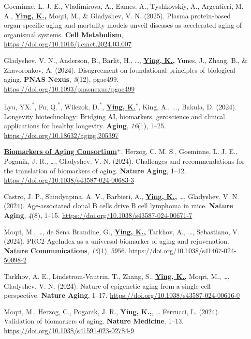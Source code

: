 \documentclass[
  11pt,
]
{article}
\begin{document}
Goeminne, L. J. E., Vladimirova, A., Eames, A., Tyshkovskiy, A.,
Argentieri, M. A., \textbf{\underline{Ying, K.,}} Moqri, M., \&
Gladyshev, V. N. (2025). Plasma protein-based organ-specific aging and
mortality models unveil diseases as accelerated aging of organismal
systems. \textbf{Cell Metabolism},
\url{https://doi.org/10.1016/j.cmet.2024.03.007}

Gladyshev, V. N., Anderson, B., Barlit, H., \ldots,
\textbf{\underline{Ying, K.,}} Yunes, J., Zhang, B., \& Zhavoronkov, A.
(2024). Disagreement on foundational principles of biological aging.
\textbf{PNAS Nexus}, \emph{3}(12), pgae499.
\url{https://doi.org/10.1093/pnasnexus/pgae499}

Lyu, YX.\textsuperscript{*}, Fu, Q.\textsuperscript{*}, Wilczok,
D.\textsuperscript{*}, \textbf{\underline{Ying, K.$^{*}$}}, King, A.,
..., Bakula, D. (2024). Longevity biotechnology: Bridging AI,
biomarkers, geroscience and clinical applications for healthy longevity.
\textbf{Aging}, \emph{16}(1), 1--25.
\url{https://doi.org/10.18632/aging.205397}

\textbf{\underline{Biomarkers of Aging Consortium$^{+}$}}, Herzog, C. M.
S., Goeminne, L. J. E., Poganik, J. R., \ldots, Gladyshev, V. N. (2024).
Challenges and recommendations for the translation of biomarkers of
aging. \textbf{Nature Aging}, 1--12.
\url{https://doi.org/10.1038/s43587-024-00683-3}

Castro, J. P., Shindyapina, A. V., Barbieri, A.,
\textbf{\underline{Ying, K.,}} \ldots, Gladyshev, V. N. (2024).
Age-associated clonal B cells drive B cell lymphoma in mice.
\textbf{Nature Aging}, \emph{4}(8), 1--15.
\url{https://doi.org/10.1038/s43587-024-00671-7}

Moqri, M., \ldots, de Sena Brandine, G., \textbf{\underline{Ying, K.,}}
Tarkhov, A., \ldots, Sebastiano, V. (2024). PRC2-AgeIndex as a universal
biomarker of aging and rejuvenation. \textbf{Nature Communications},
\emph{15}(1), 5956. \url{https://doi.org/10.1038/s41467-024-50098-2}

Tarkhov, A. E., Lindstrom-Vautrin, T., Zhang, S.,
\textbf{\underline{Ying, K.,}} Moqri, M., \ldots, Gladyshev, V. N.
(2024). Nature of epigenetic aging from a single-cell perspective.
\textbf{Nature Aging}, 1--17.
\url{https://doi.org/10.1038/s43587-024-00616-0}

Moqri, M., Herzog, C., Poganik, J. R., \textbf{\underline{Ying, K.,}},
\ldots{} Ferrucci, L. (2024). Validation of biomarkers of aging.
\textbf{Nature Medicine}, 1--13.
\url{https://doi.org/10.1038/s41591-023-02784-9}
\end{document}
